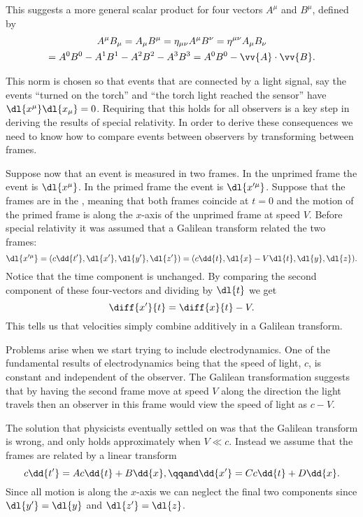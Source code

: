\documentclass[fleqn]{NotesClass}
\begin{document}
    This suggests a more general scalar product for four vectors \(A^\mu\) and \(B^\mu\), defined by
    \begin{multline}
        A^\mu B_\mu = A_\mu B^\mu = \eta_{\mu\nu}A^\mu B^\nu = \eta^{\mu\nu} A_\mu B_\nu\\
        = A^0B^0 - A^1B^1 - A^2B^2 - A^3B^3 = A^0B^0 - \vv{A} \cdot \vv{B}.
    \end{multline}
    
    This norm is chosen so that events that are connected by a light signal, say the events \enquote{turned on the torch} and \enquote{the torch light reached the sensor} have \(\dl{x^\mu}\dl{x_\mu} = 0\).
    Requiring that this holds for all observers is a key step in deriving the results of special relativity.
    In order to derive these consequences we need to know how to compare events between observers by transforming between frames.
    
    Suppose now that an event is measured in two frames.
    In the unprimed frame the event is \(\dl{x^\mu}\).
    In the primed frame the event is \(\dl{x'^\mu}\).
    Suppose that the frames are in the , meaning that both frames coincide at \(t = 0\) and the motion of the primed frame is along the \(x\)-axis of the unprimed frame at speed \(V\).
    Before special relativity it was assumed that a Galilean transform related the two frames:
    \begin{equation}
        \dl{x'^\mu} = (c\dd{t'}, \dl{x'}, \dl{y'}, \dl{z'}) = (c\dd{t}, \dl{x} - V\dl{t}, \dl{y}, \dl{z}).
    \end{equation}
    Notice that the time component is unchanged.
    By comparing the second component of these four-vectors and dividing by \(\dl{t}\) we get
    \begin{equation}
        \diff{x'}{t} = \diff{x}{t} - V.
    \end{equation}
    This tells us that velocities simply combine additively in a Galilean transform.
    
    Problems arise when we start trying to include electrodynamics.
    One of the fundamental results of electrodynamics being that the speed of light, \(c\), is constant and independent of the observer.
    The Galilean transformation suggests that by having the second frame move at speed \(V\) along the direction the light travels then an observer in this frame would view the speed of light as \(c - V\).
    
    The solution that physicists eventually settled on was that the Galilean transform is wrong, and only holds approximately when \(V \ll c\).
    Instead we assume that the frames are related by a linear transform
    \begin{equation}
        c\dd{t'} = Ac\dd{t} + B\dd{x}, \qqand \dd{x'} = Cc\dd{t} + D\dd{x}.
    \end{equation}
    Since all motion is along the \(x\)-axis we can neglect the final two components since \(\dl{y'} = \dl{y}\) and \(\dl{z'} = \dl{z}\).
    
\end{document}
